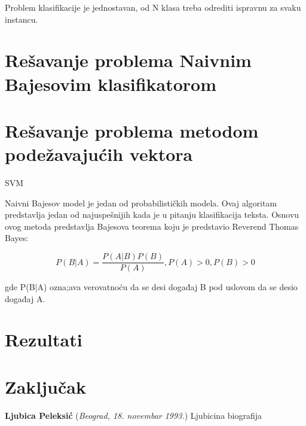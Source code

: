 \documentclass[12pt,oneside]{memoir}
\begin{document}
Problem klasifikacije je jednostavan, od N klasa treba odrediti ispravnu za svaku instancu.  

\chapter{Rešavanje problema Naivnim Bajesovim klasifikatorom}


\chapter{Rešavanje problema metodom podežavajućih vektora}

SVM




Naivni Bajesov model je jedan od probabilističkih modela.  Ovaj algoritam predstavlja jedan od najuspešnijih kada je u pitanju klasifikacija teksta.  Osnovu ovog metoda predstavlja Bajesova teorema koju je predstavio Reverend Thomas Bayes:

\begin{equation}
	P(B|A) = \frac{P(A|B)P(B)}{P(A)}, P(A)>0, P(B)>0
\end{equation}

gde P(B|A) ozna;ava verovatnoću da se desi događaj B pod uslovom da se desio događaj A. 

\chapter{Rezultati}



\chapter{Zaključak}





% 





\backmatter


\begin{biografija}
  \textbf{Ljubica Peleksić} (\emph{Beograd,
    18.  novembar 1993.}) 
	Ljubicina biografija
\end{biografija}
\end{document}
